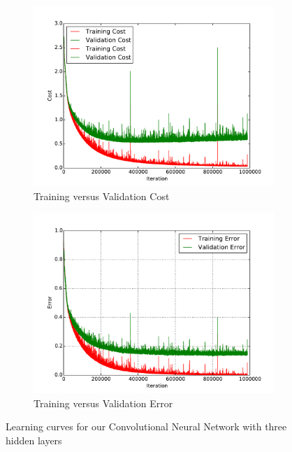 \begin{figure}[H]
	\centering
	\begin{subfigure}[b]{0.45\linewidth}
		\centering
		\includegraphics[width=\linewidth]{images/3/train_val_cost.pdf}
		\caption{Training versus Validation Cost}
	\end{subfigure}
	\hfill
	\begin{subfigure}[b]{0.45\linewidth}
		\centering
		\includegraphics[width=\linewidth]{images/3/train_val_error.pdf}
		\caption{Training versus Validation Error}
	\end{subfigure}
	\caption{Learning curves for our Convolutional Neural Network with three hidden layers }
	\label{cnn_plot}
\end{figure}
